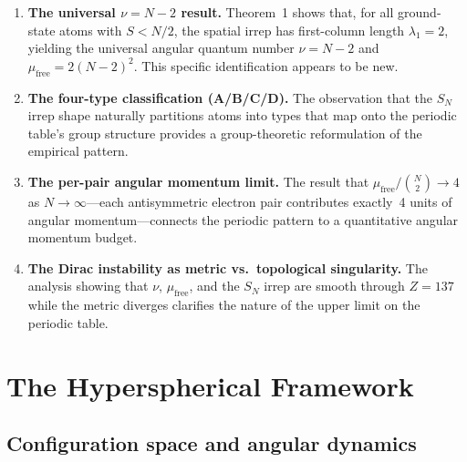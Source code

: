 \documentclass[aps,prl,twocolumn,superscriptaddress,longbibliography]{revtex4-2}
\newcommand{\mufree}{\mu_{\mathrm{free}}}
\begin{document}
\begin{enumerate}
  \item \textbf{The universal $\nu = N - 2$ result.}  Theorem~1 shows
    that, for all ground-state atoms with $S < N/2$, the spatial
    irrep has first-column length $\lambda_1 = 2$, yielding the
    universal angular quantum number $\nu = N - 2$ and $\mufree =
    2(N-2)^2$.  This specific identification appears to be new.

  \item \textbf{The four-type classification (A/B/C/D).}  The
    observation that the $S_N$ irrep shape naturally partitions atoms
    into types that map onto the periodic table's group structure
    provides a group-theoretic reformulation of the empirical pattern.

  \item \textbf{The per-pair angular momentum limit.}  The result that
    $\mufree / \binom{N}{2} \to 4$ as $N \to \infty$---each
    antisymmetric electron pair contributes exactly~4 units of
    angular momentum---connects the periodic pattern to a
    quantitative angular momentum budget.

  \item \textbf{The Dirac instability as metric vs.\ topological
    singularity.}  The analysis showing that $\nu$, $\mufree$, and
    the $S_N$ irrep are smooth through $Z = 137$ while the metric
    diverges clarifies the nature of the upper limit on the periodic
    table.
\end{enumerate}


\section{The Hyperspherical Framework}
\label{sec:framework}

\subsection{Configuration space and angular dynamics}
\label{sec:config}
\end{document}
